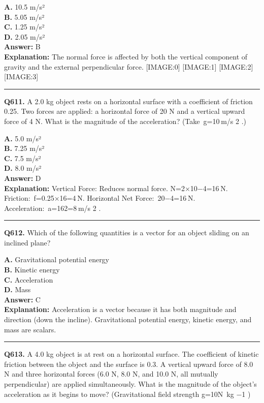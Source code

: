 \documentclass[12pt]{article}
\begin{document}
\textbf{A.} 10.5 m/s² \\
\textbf{B.} 5.05 m/s² \\
\textbf{C.} 1.25 m/s² \\
\textbf{D.} 2.05 m/s² \\

\textbf{Answer:} B \\
\textbf{Explanation:} The normal force is affected by both the vertical component of gravity and the external perpendicular force.
[IMAGE:0]
[IMAGE:1]
[IMAGE:2]
[IMAGE:3]

\hrule
\vspace{1em}


\noindent
\textbf{Q611.} A 2.0 kg object rests on a horizontal surface with a coefficient of friction 0.25. Two forces are applied: a horizontal force of 20 N and a vertical upward force of 4 N. What is the magnitude of the acceleration? (Take g=10 m/s
2
.)



\textbf{A.} 5.0 m/s² \\
\textbf{B.} 7.25 m/s² \\
\textbf{C.} 7.5 m/s² \\
\textbf{D.} 8.0 m/s² \\

\textbf{Answer:} D \\
\textbf{Explanation:} Vertical Force: Reduces normal force.
N=2×10−4=16 N.
Friction: f=0.25×16=4 N.
Horizontal Net Force: 20−4=16 N.
Acceleration: a=162=8 m/s
2
.

\hrule
\vspace{1em}


\noindent
\textbf{Q612.} Which of the following quantities is a vector for an object sliding on an inclined plane?



\textbf{A.} Gravitational potential energy \\
\textbf{B.} Kinetic energy \\
\textbf{C.} Acceleration \\
\textbf{D.} Mass \\

\textbf{Answer:} C \\
\textbf{Explanation:} Acceleration is a vector because it has both magnitude and direction (down the incline). Gravitational potential energy, kinetic energy, and mass are scalars.

\hrule
\vspace{1em}


\noindent
\textbf{Q613.} A 4.0 kg object is at rest on a horizontal surface. The coefficient of kinetic friction between the object and the surface is 0.3. A vertical upward force of 8.0 N and three horizontal forces (6.0 N, 8.0 N, and 10.0 N, all mutually perpendicular) are applied simultaneously. What is the magnitude of the object's acceleration as it begins to move? (Gravitational field strength g=10N kg
−1
)
\end{document}
